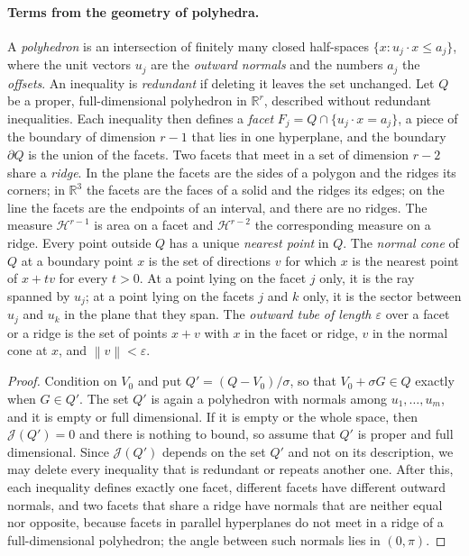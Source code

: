 \documentclass[11pt,letterpaper]{article}
\newif\ifshowrev
\newenvironment{revblock}{\ifshowrev\color{revblue}%
\hypersetup{linkcolor=revblue,citecolor=revblue,urlcolor=revblue}\fi}{}
\newif\ifshowgeo
\newenvironment{geoblock}{\ifshowgeo\color{revblue}%
\hypersetup{linkcolor=revblue,citecolor=revblue,urlcolor=revblue}\fi}{}
\theoremstyle{remark}
\newcommand{\R}{\mathbb R}
\newcommand{\norm}[1]{\left\lVert#1\right\rVert}
\newcommand{\surf}{\mathcal J}
\begin{document}
\begin{revblock}
\begin{geoblock}
\paragraph{Terms from the geometry of polyhedra.}
A \emph{polyhedron} is an intersection of finitely many closed half-spaces
\(\{x:u_j\cdot x\le a_j\}\), where the unit vectors \(u_j\) are the
\emph{outward normals} and the numbers \(a_j\) the \emph{offsets}. An
inequality is \emph{redundant} if deleting it leaves the set unchanged. Let
\(Q\) be a proper, full-dimensional polyhedron in \(\R^r\), described without
redundant inequalities. Each inequality then defines a \emph{facet}
\(F_j=Q\cap\{u_j\cdot x=a_j\}\), a piece of the boundary of dimension
\(r-1\) that lies in one hyperplane, and the boundary \(\partial Q\) is the
union of the facets. Two facets that meet in a set of dimension \(r-2\)
share a \emph{ridge}. In the plane the facets are the sides of a polygon and
the ridges its corners; in \(\R^3\) the facets are the faces of a solid and
the ridges its edges; on the line the facets are the endpoints of an
interval, and there are no ridges. The measure \(\mathcal H^{r-1}\) is area
on a facet and \(\mathcal H^{r-2}\) the corresponding measure on a ridge.
Every point outside \(Q\) has a unique \emph{nearest point} in \(Q\). The
\emph{normal cone} of \(Q\) at a boundary point \(x\) is the set of
directions \(v\) for which \(x\) is the nearest point of \(x+tv\) for every
\(t>0\). At a point lying on the facet \(j\) only, it is the ray spanned by
\(u_j\); at a point lying on the facets \(j\) and \(k\) only, it is the
sector between \(u_j\) and \(u_k\) in the plane that they span. The
\emph{outward tube of length \(\varepsilon\)} over a facet or a ridge is
the set of points \(x+v\) with \(x\) in the facet or ridge, \(v\) in the
normal cone at \(x\), and \(\norm v<\varepsilon\).
\end{geoblock}

\begin{proof}
\begin{geoblock}
Condition on \(V_0\) and put \(Q'=(Q-V_0)/\sigma\), so that
\(V_0+\sigma G\in Q\) exactly when \(G\in Q'\). The set \(Q'\) is again a
polyhedron with normals among \(u_1,\ldots,u_m\), and it is empty or full
dimensional. If it is empty or the whole space, then \(\surf(Q')=0\) and
there is nothing to bound, so assume that \(Q'\) is proper and full
dimensional. Since \(\surf(Q')\) depends on the set \(Q'\) and not on its
description, we may delete every inequality that is redundant or repeats
another one. After this, each inequality defines exactly one facet, different
facets have different outward normals, and two facets that share a ridge
have normals that are neither equal nor opposite, because facets in parallel
hyperplanes do not meet in a ridge of a full-dimensional polyhedron; the
angle between such normals lies in \((0,\pi)\).


\end{geoblock}
\end{proof}
\end{revblock}
\end{document}
